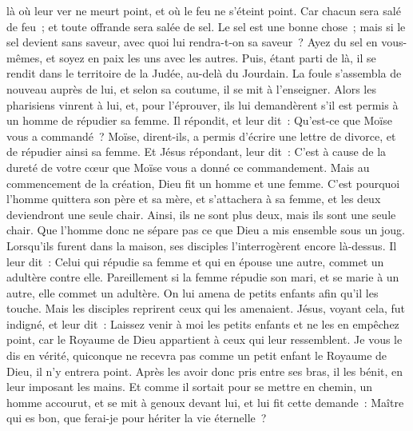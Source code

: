 \begin{multicols}{2}
là où leur ver ne meurt point, et où le feu ne s'éteint point.
Car chacun sera salé de feu~; et toute offrande sera salée de sel.
Le sel est une bonne chose~; mais si le sel devient sans saveur, avec quoi lui rendra-t-on sa saveur~?
Ayez du sel en vous-mêmes, et soyez en paix les uns avec les autres.
\VerseOne{}Puis, étant parti de là, il se rendit dans le territoire de la Judée, au-delà du Jourdain. La foule s'assembla de nouveau auprès de lui, et selon sa coutume, il se mit à l'enseigner.
Alors les pharisiens vinrent à lui, et, pour l'éprouver, ils lui demandèrent s'il est permis à un homme de répudier sa femme.
Il répondit, et leur dit~: Qu'est-ce que Moïse vous a commandé~?
Moïse, dirent-ils, a permis d'écrire une lettre de divorce, et de répudier ainsi sa femme.
Et Jésus répondant, leur dit~: C'est à cause de la dureté de votre cœur que Moïse vous a donné ce commandement.
Mais au commencement de la création, Dieu fit un homme et une femme.
C'est pourquoi l'homme quittera son père et sa mère, et s'attachera à sa femme,
et les deux deviendront une seule chair. Ainsi, ils ne sont plus deux, mais ils sont une seule chair.
Que l'homme donc ne sépare pas ce que Dieu a mis ensemble sous un joug.
Lorsqu'ils furent dans la maison, ses disciples l'interrogèrent encore là-dessus.
Il leur dit~: Celui qui répudie sa femme et qui en épouse une autre, commet un adultère contre elle.
Pareillement si la femme répudie son mari, et se marie à un autre, elle commet un adultère.
On lui amena de petits enfants afin qu'il les touche. Mais les disciples reprirent ceux qui les amenaient.
Jésus, voyant cela, fut indigné, et leur dit~: Laissez venir à moi les petits enfants et ne les en empêchez point, car le Royaume de Dieu appartient à ceux qui leur ressemblent.
Je vous le dis en vérité, quiconque ne recevra pas comme un petit enfant le Royaume de Dieu, il n'y entrera point.
Après les avoir donc pris entre ses bras, il les bénit, en leur imposant les mains.
Et comme il sortait pour se mettre en chemin, un homme accourut, et se mit à genoux devant lui, et lui fit cette demande~: Maître qui es bon, que ferai-je pour hériter la vie éternelle~?

\end{multicols}
